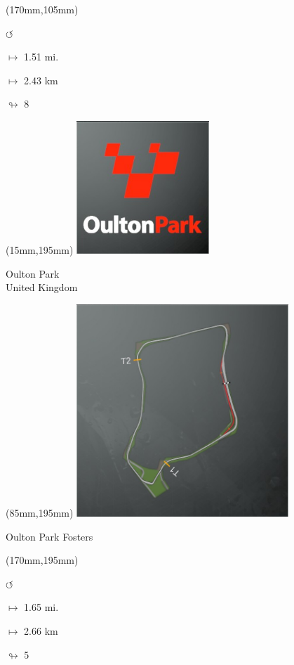 \begin{textblock*}{30mm}(170mm,105mm)%
\par \Huge$\circlearrowleft$
\Large
\par$\mapsto$ 1.51 mi.
\par$\mapsto$ 2.43 km
\par$\looparrowright$ 8
\end{textblock*}
\begin{textblock*}{60mm}(15mm,195mm)%
\includegraphics[width=50mm]{LG/2015-05-20_00091.png}
\par Oulton Park\\ United Kingdom
\end{textblock*}
\begin{textblock*}{80mm}(85mm,195mm)%
\includegraphics[width=80mm]{TR/2015-05-20_00050.png}
\centerline{Oulton Park Fosters}
\end{textblock*}
\begin{textblock*}{30mm}(170mm,195mm)%
\par \Huge$\circlearrowleft$
\Large
\par$\mapsto$ 1.65 mi.
\par$\mapsto$ 2.66 km
\par$\looparrowright$ 5
\end{textblock*}
\null\newpage

